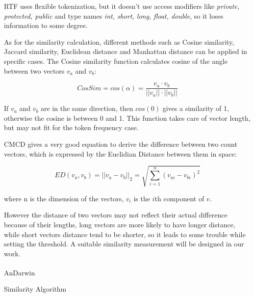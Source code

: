 \documentclass[../main.tex]{subfiles}
\begin{document}
RTF uses flexible tokenization, but it doesn't use access modifiers like \emph{private, protected, public} and type names \emph{int, short, long, float, double}, so it loses information to some degree.

As for the similarity calculation, different methods such as Cosine similarity, Jaccard similarity, Euclidean distance and Manhattan distance can be applied in specific cases.
The Cosine similarity function calculates cosine of the angle between two vectors $v_a$ and $v_b$:

\begin{equation}
CosSim = cos(\alpha) = \frac{v_a \cdot v_b}{||v_a|| \cdot ||v_b||} \nonumber
\end{equation}

If $v_a$ and $v_b$ are in the same direction, then $cos(0)$ gives a similarity of 1, otherwise the cosine is between 0 and 1. This function takes care of vector length, but may not fit for the token frequency case. 

CMCD gives a very good equation to derive the difference between two count vectors, which is expressed by the Euclidian Distance between them in space:

\begin{equation}
ED(v_a, v_b) = ||v_a - v_b||_2 = \sqrt{\sum_{i=1}^n(v_{ai} - v_{bi})^2} \nonumber
\end{equation}

where n is the dimension of the vectors, $v_i$ is the $i$th component of $v$.

However the distance of two vectors may not reflect their actual difference because of their lengths, long vectors are more likely to have longer distance, while short vectors distance tend to be shorter, so it leads to some trouble while setting the threshold. A suitable similarity measurement will be designed in our work.\\ \\



AnDarwin

Similarity Algorithm
\end{document}
